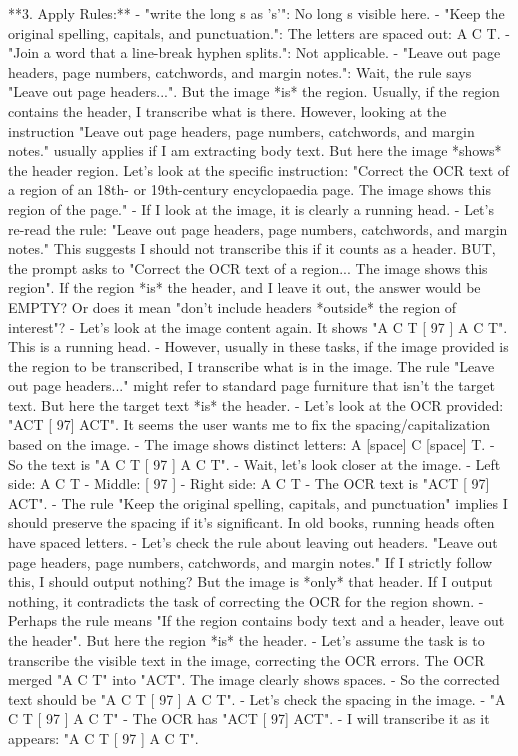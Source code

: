 \documentclass{article}
\begin{document}
**3. Apply Rules:**
- "write the long s as 's'": No long s visible here.
- "Keep the original spelling, capitals, and punctuation.": The letters are spaced out: A C T.
- "Join a word that a line-break hyphen splits.": Not applicable.
- "Leave out page headers, page numbers, catchwords, and margin notes.": Wait, the rule says "Leave out page headers...". But the image *is* the region. Usually, if the region contains the header, I transcribe what is there. However, looking at the instruction "Leave out page headers, page numbers, catchwords, and margin notes." usually applies if I am extracting body text. But here the image *shows* the header region. Let's look at the specific instruction: "Correct the OCR text of a region of an 18th- or 19th-century encyclopaedia page. The image shows this region of the page."
- If I look at the image, it is clearly a running head.
- Let's re-read the rule: "Leave out page headers, page numbers, catchwords, and margin notes." This suggests I should not transcribe this if it counts as a header. BUT, the prompt asks to "Correct the OCR text of a region... The image shows this region". If the region *is* the header, and I leave it out, the answer would be EMPTY? Or does it mean "don't include headers *outside* the region of interest"?
- Let's look at the image content again. It shows "A C T [ 97 ] A C T". This is a running head.
- However, usually in these tasks, if the image provided is the region to be transcribed, I transcribe what is in the image. The rule "Leave out page headers..." might refer to standard page furniture that isn't the target text. But here the target text *is* the header.
- Let's look at the OCR provided: "ACT [ 97] ACT". It seems the user wants me to fix the spacing/capitalization based on the image.
- The image shows distinct letters: A [space] C [space] T.
- So the text is "A C T [ 97 ] A C T".
- Wait, let's look closer at the image.
- Left side: A C T
- Middle: [ 97 ]
- Right side: A C T
- The OCR text is "ACT [ 97] ACT".
- The rule "Keep the original spelling, capitals, and punctuation" implies I should preserve the spacing if it's significant. In old books, running heads often have spaced letters.
- Let's check the rule about leaving out headers. "Leave out page headers, page numbers, catchwords, and margin notes." If I strictly follow this, I should output nothing? But the image is *only* that header. If I output nothing, it contradicts the task of correcting the OCR for the region shown.
- Perhaps the rule means "If the region contains body text and a header, leave out the header". But here the region *is* the header.
- Let's assume the task is to transcribe the visible text in the image, correcting the OCR errors. The OCR merged "A C T" into "ACT". The image clearly shows spaces.
- So the corrected text should be "A C T [ 97 ] A C T".
- Let's check the spacing in the image.
- "A   C   T   [   97   ]   A   C   T"
- The OCR has "ACT [ 97] ACT".
- I will transcribe it as it appears: "A C T [ 97 ] A C T".
\end{document}
